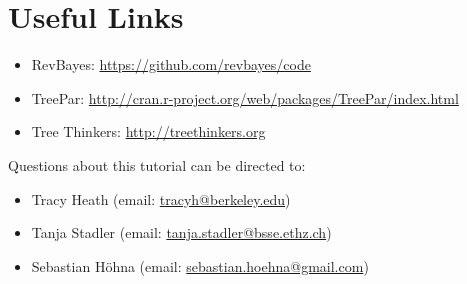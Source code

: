 %
%
%
%
%
%
%


\bigskip
\section*{Useful Links}

\begin{itemize}
\item RevBayes: \href{https://github.com/revbayes/code}{https://github.com/revbayes/code} \\ \vspace{-7mm}
\item TreePar: \href{http://cran.r-project.org/web/packages/TreePar/index.html}{http://cran.r-project.org/web/packages/TreePar/index.html} \\ \vspace{-7mm}
\item Tree Thinkers: \href{http://treethinkers.org/}{http://treethinkers.org} \\ \vspace{-7mm}
\end{itemize}

Questions about this tutorial can be directed to: \\\vspace{-10mm}
\begin{itemize}
\item Tracy Heath (email: \href{mailto:tracyh@berkeley.edu}{tracyh@berkeley.edu}) \\\vspace{-8mm}
\item Tanja Stadler (email: \href{mailto:tanja.stadler@bsse.ethz.ch}{tanja.stadler@bsse.ethz.ch}) \\\vspace{-8mm} 
\item Sebastian H\"{o}hna (email: \href{mailto:sebastian.hoehna@gmail.com}{sebastian.hoehna@gmail.com})
\end{itemize}